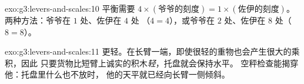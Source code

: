 \begin{solution}{exo:g3:levers-and-scales:10}
平衡需要 $4 \times (\text{爷爷的刻度}) = 1 \times
(\text{佐伊的刻度})$。两种方法：爷爷在 $1$ 处、佐伊在 $4$ 处
（$4 = 4$），或爷爷在 $2$ 处、佐伊在 $8$ 处（$8 = 8$）。
\end{solution}

\begin{solution}{exo:g3:levers-and-scales:11}
更轻。在长臂一端，即使很轻的重物也会产生很大的乘积，因此
只要货物比短臂上诚实的积木\emph{轻}，托盘就会保持水平。
空秤检查能揭穿他：托盘里什么也不放时，
他的天平就已经向长臂一侧倾斜。
\end{solution}
